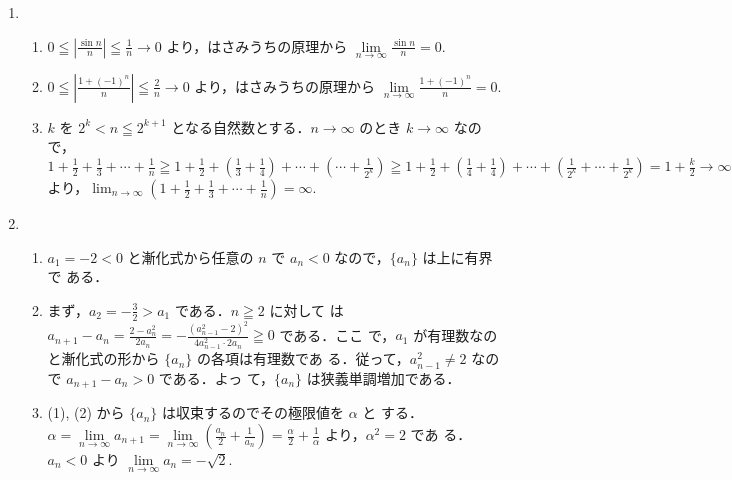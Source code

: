 \documentclass[11pt, uplatex, dvipdfmx, twoside]{jsarticle}
\newcommand{\ds}{\displaystyle}
\renewcommand{\dlim}{\lim\limits} %
\begin{document}
\begin{enumerate}[label=\ref{sec:sequence}.\arabic*]
  \setlength{\itemsep}{1ex}
  
\item
  \begin{enumerate}[label=(\arabic*)]
    \setlength{\itemsep}{1ex}
    
  \item
    $0 \leqq \left| \frac{\sin n}{n}\right| \leqq \frac{1}{n} \to
    0$ より，はさみうちの原理から $\dlim_{n \to \infty} \frac{\sin
      n}{n} = 0.$

  \item
    $0 \leqq \left| \frac{1+(-1)^n}{n}\right| \leqq \frac{2}{n}
    \to 0$ より，はさみうちの原理から
    $\dlim_{n \to \infty}\frac{1+(-1)^n}{n} =0.$

  \item $k$ を $2^k < n \leqq 2^{k+1}$ となる自然数とする．$n \to
    \infty$ のとき $k \to \infty$
    なので，$1+\frac{1}{2}+\frac{1}{3}+ \cdots + \frac{1}{n} \geqq 1 +
    \frac{1}{2} + \left( \frac{1}{3} + \frac{1}{4}\right) + \cdots +
    \left( \cdots + \frac{1}{2^k}\right) \geqq 1 + \frac{1}{2} +
    \left(\frac{1}{4} + \frac{1}{4}\right) + \cdots + \left(
      \frac{1}{2^k} + \cdots + \frac{1}{2^k}\right) = 1+ \frac{k}{2}
    \to \infty \; (k \to
    \infty)$ より，${\ds \lim_{n \to \infty}} \left(1+\frac{1}{2} +
      \frac{1}{3} + \cdots + \frac{1}{n}\right) = \infty.$
  \end{enumerate}

\item
  \begin{enumerate}[label=(\arabic*)]
    \setlength{\itemsep}{1ex}

  \item $a_1=-2<0$ と漸化式から任意の $n$ で $a_n <0$ なので，$\{a_n\}$ は上に有界で
    ある．
    
  \item まず，$a_2=-\frac{3}{2} >a_1$ である．$n \geqq 2$ に対して
    は $a_{n+1}-a_{n} = \frac{2-a_{n}^2}{2a_n} = -
    \frac{(a_{n-1}^2-2)^2}{4a_{n-1}^2 \cdot 2a_n} \geqq 0$ である．ここ
    で，$a_1$ が有理数なのと漸化式の形から $\{a_n\}$ の各項は有理数であ
    る．従って，$a_{n-1}^2 \neq 2$ なので $a_{n+1}-a_n >0$ である．よっ
    て，$\{a_n\}$ は狭義単調増加である．
    
  \item (1), (2) から $\{a_n\}$ は収束するのでその極限値を $\alpha$ と
    する．$\alpha = \dlim_{n \to \infty} a_{n+1} = \dlim_{n \to
      \infty} \left( \frac{a_n}{2}+\frac{1}{a_n}\right) =
    \frac{\alpha}{2}+\frac{1}{\alpha}$ より，$\alpha^2 = 2$ であ
    る．$a_n <0$ より $\dlim_{n \to \infty} a_n = -\sqrt{2}$.


\end{enumerate}
\end{enumerate}
\end{document}
